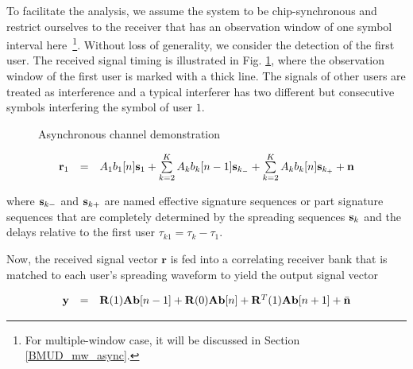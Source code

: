 \documentclass[a4paper,11pt,fleqn]{article}
\newcommand{\br}{{\mathbf r}}
\newcommand{\bA}{{\mathbf A}}
\newcommand{\bb}{{\bf b}}
\newcommand{\bs}{{\bf s}}
\newcommand{\bn}{{\bf n}}
\newcommand{\by}{{\bf y}}
\newcommand{\bR}{{\bf R}}
\begin{document}
To facilitate the analysis, we assume the system to be
chip-synchronous and restrict ourselves to the receiver that has
an observation window of one symbol interval here~\footnote{For
multiple-window case, it will be discussed in Section
\ref{BMUD_mw_async}.}. Without loss of generality, we consider the
detection of the first user. The received signal timing is
illustrated in Fig. \ref{channel}, where the observation window of
the first user is marked with a thick line. The signals of other
users are treated as interference and a typical interferer has two
different but consecutive symbols interfering the symbol of user
$1$.

\begin{figure}
\caption{Asynchronous channel demonstration}\label{channel}
\end{figure}

\begin{equation}
\begin{array}{rcl}
\br_1&=&A_1b_1[n]\bs_1+\sum\limits_{k=2}^{K}A_k b_k[n-1]
\bs_{k_-}+\sum\limits_{k=2}^{K}A_k b_k[n] \bs_{k_+} + \bn
\end{array} \label{r}
\end{equation}

\noindent where $\bs_{k-}$ and $\bs_{k+}$ are named effective
signature sequences or part signature sequences that are
completely determined by the spreading sequences $\bs_k$ and the
delays relative to the first user $\tau_{k1}=\tau_k-\tau_1$.

Now, the received signal vector $\br$ is fed into a correlating
receiver bank that is matched to each user's spreading waveform to
yield the output signal vector

\begin{equation}
\begin{array}{rcl}
\by&=&\bR(1)\bA\bb[n-1]+\bR(0)\bA\bb[n]+\bR^T(1)\bA\bb[n+1]+\bar{\bn}
\end{array}
\end{equation}
\end{document}
